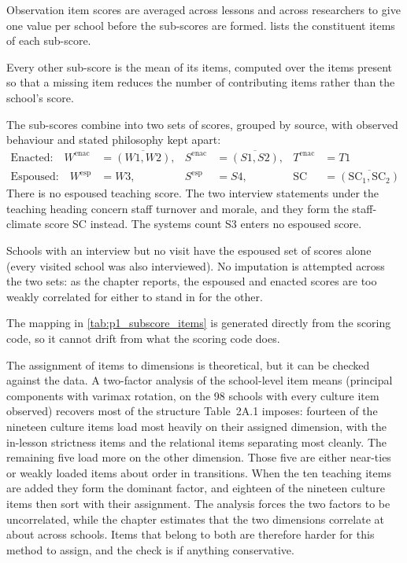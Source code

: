 Observation item scores are averaged across lessons and across researchers
to give one value per school before the sub-scores are formed.
 lists the constituent items of each sub-score.



Every other sub-score is the mean of its items, computed over the items
present so that a missing item reduces the number of contributing items
rather than the school's score.

The sub-scores combine into two sets of scores, grouped by source, with
observed behaviour and stated philosophy kept apart:
%
\begin{align}
\text{Enacted:}\quad
  W^{\text{enac}} &= \overline{(W1, W2)}, &
  S^{\text{enac}} &= \overline{(S1, S2)}, &
  T^{\text{enac}} &= T1 \label{eq:enacted} \\
\text{Espoused:}\quad
  W^{\text{esp}}  &= W3, &
  S^{\text{esp}}  &= S4, &
  \mathrm{SC} &= \overline{(\text{SC}_{1}, \text{SC}_{2})} \label{eq:espoused}
\end{align}
%
There is no espoused teaching score. The two interview statements under the
teaching heading concern staff turnover and morale, and they form the staff-climate score SC instead. The systems count S3 enters no espoused score.

Schools with an interview but no visit have the espoused set of scores alone
(every visited school was also interviewed). No imputation is attempted across the two sets: as the chapter reports, the espoused and enacted scores are too weakly correlated for either to stand in for the other.

The mapping in \cref{tab:p1_subscore_items} is generated directly from the
scoring code, so it cannot drift from what the scoring code does.

The assignment of items to dimensions is theoretical, but it can be checked
against the data. A two-factor analysis of the school-level item means
(principal components with varimax rotation, on the 98 schools with every
culture item observed) recovers most of the structure Table~2A.1 imposes:
fourteen of the nineteen culture items load most heavily on their assigned
dimension, with the in-lesson strictness items and the relational items
separating most cleanly. The remaining five load more on the other dimension. Those five are either near-ties or weakly loaded items about order in transitions. When the ten teaching items are
added they form the dominant factor, and eighteen of the nineteen culture
items then sort with their assignment. The analysis forces the two factors to be uncorrelated, while the chapter estimates that the two dimensions correlate at about \CorrWSTrueSchool{} across schools. Items that belong to both are therefore harder for this method to assign, and the check is if anything conservative.

